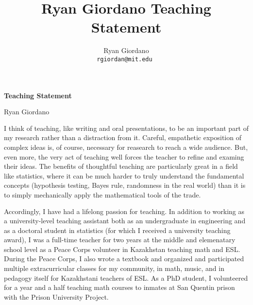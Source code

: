 

\usepackage{enumitem}

\usepackage{geometry}
\geometry{top=0.9in}
\geometry{left=1.4in}
\geometry{right=1.4in}


\title{Ryan Giordano Teaching Statement}

\author{
  Ryan Giordano \\ \texttt{rgiordan@mit.edu }
}




\begin{minipage}[t]{0.5\textwidth}
\hspace{-2em} %
{\bf \LARGE Teaching Statement}\\
\end{minipage}
\begin{minipage}[t]{0.5\textwidth}
        \hspace{8em} %
        {\LARGE Ryan Giordano}
\end{minipage}

I think of teaching, like writing and oral presentations, to be an important
part of my research rather than a distraction from it.  Careful, empathetic
exposition of complex ideas is, of course, necessary for reasearch to reach a
wide audience.  But, even more, the very act of teaching well forces the teacher
to refine and examing their ideas.  The benefits of thoughtful teaching are
particularly great in a field like statistics, where it can be much harder to
truly understand the fundamental concepts (hypothesis testing, Bayes rule,
randomness in the real world) than it is to simply mechanically apply the
mathematical tools of the trade.

Accordingly, I have had a lifelong passion for teaching.  In addition to working
as a university-level teaching assistant both as an undergraduate in engineering
and as a doctoral student in statistics (for which I received a university
teaching award), I was a full-time teacher for two years at the middle and
elemenatary school level as a Peace Corps volunteer in Kazakhstan teaching math
and ESL.  During the Peace Corps, I also wrote a textbook and organized and
participated multiple extracurricular classes for my community, in math, music,
and in pedagogy itself for Kazakhstani teachers of ESL.  As a PhD student, I
volunteered for a year and a half teaching math courses to inmates at San
Quentin prison with the Prison University Project.

